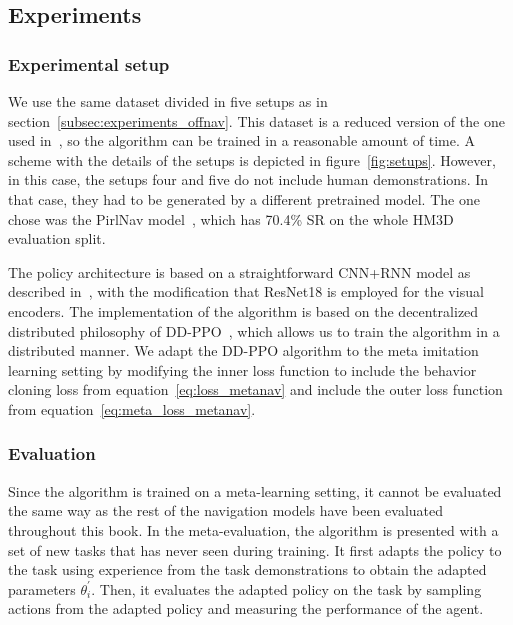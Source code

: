 \subsection{Experiments}\label{subsec:experiments_metanav}

\subsubsection{Experimental setup}\label{subsubsec:experimental-setup}

We use the same dataset divided in five setups as in section~\ref{subsec:experiments_offnav}.
This dataset is a reduced version of the one used in~\cite{ramrakhya2023}, so the algorithm can be trained in a reasonable amount of time.
A scheme with the details of the setups is depicted in figure~\ref{fig:setups}.
However, in this case, the setups four and five do not include human demonstrations.
In that case, they had to be generated by a different pretrained model.
The one chose was the PirlNav model~\cite{ramrakhya2023}, which has 70.4\% SR on the whole HM3D evaluation split.

The policy architecture is based on a straightforward CNN+RNN model as described in~\cite{ramrakhya2023}, with the modification that ResNet18 is employed for the visual encoders.
The implementation of the algorithm is based on the decentralized distributed philosophy of DD-PPO~\cite{wijmans2020}, which allows us to train the algorithm in a distributed manner.
We adapt the DD-PPO algorithm to the meta imitation learning setting by modifying the inner loss function to include the behavior cloning loss from equation~\ref{eq:loss_metanav} and include the outer loss function from equation~\ref{eq:meta_loss_metanav}.

\subsubsection{Evaluation}\label{subsubsec:evaluation_metanav}

Since the algorithm is trained on a meta-learning setting, it cannot be evaluated the same way as the rest of the navigation models have been evaluated throughout this book.
In the meta-evaluation, the algorithm is presented with a set of new tasks that has never seen during training.
It first adapts the policy to the task using experience from the task demonstrations to obtain the adapted parameters $\theta^\prime_i$.
Then, it evaluates the adapted policy on the task by sampling actions from the adapted policy and measuring the performance of the agent.

